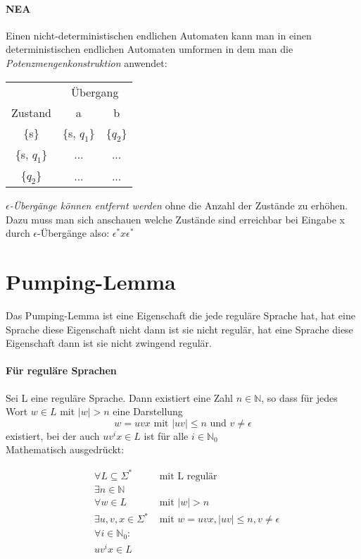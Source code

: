 \documentclass[a4paper]{scrartcl}
\begin{document}
	\paragraph{NEA}
	Einen nicht-deterministischen endlichen Automaten kann man in einen deterministischen endlichen Automaten umformen in dem man die \emph{Potenzmengenkonstruktion} anwendet:
	
	\begin{table}[h]
		\centering
		 \begin{tabular}{|c|c|c|}
			\hline 
			& \multicolumn{2}{c|}{Übergang} \\  
			Zustand & a & b \\ 
			\hline 
			\hline
			\{s\} & \{s, \(q_1\)\} & \{\(q_2\)\} \\ 
			\hline 
			\{s, \(q_1\)\} & ... & ... \\ 
			\hline 
			\{\(q_2\)\} & ... & ... \\ 
			\hline 
		\end{tabular} 
	\end{table}

	\emph{\( \epsilon \)-Übergänge können entfernt werden} ohne die Anzahl der Zustände zu erhöhen. Dazu muss man sich anschauen welche Zustände sind erreichbar bei Eingabe x durch \( \epsilon \)-Übergänge also: \( \epsilon^* x \epsilon^* \)
	
	\section{Pumping-Lemma}
		Das Pumping-Lemma ist eine Eigenschaft die jede reguläre Sprache hat, hat eine Sprache diese Eigenschaft nicht dann ist sie nicht regulär, hat eine Sprache diese Eigenschaft dann ist sie nicht zwingend regulär. 
		\paragraph{Für reguläre Sprachen}
		Sei L eine reguläre Sprache. Dann existiert eine Zahl \( n \in \mathbb{N} \), so dass für jedes Wort \( w \in L \) mit \( |w| > n \) eine Darstellung 
		\[
		w = uvx \text{ mit } |uv| \leq n \text{ und } v \neq \epsilon
		\]
		existiert, bei der auch \( uv^i x \in L \) ist für alle \( i \in \mathbb{N}_0 \)\\
		Mathematisch ausgedrückt:
		
		\begin{align*}
		&\forall L \subseteq \Sigma^* &\text{ mit L regulär}\\
		&\exists n \in \mathbb{N}&\\
		&\forall w \in L &\text{ mit } |w| > n\\
		&\exists u, v, x \in \Sigma^* &\text{ mit } w = uvx, |uv| \leq n, v \neq \epsilon\\
		&\forall i \in \mathbb{N}_0:&\\
		&uv^i x \in L&
		\end{align*}
		
\end{document}
